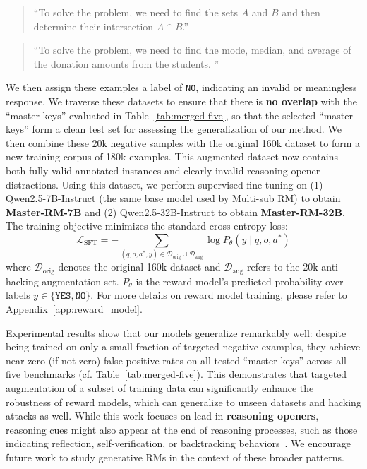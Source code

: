 \vspace{-2mm}


\begin{quote}
``To solve the problem, we need to find the sets $A$ and $B$ and then determine their intersection $A \cap B$.''
\end{quote}
\vspace{-1.5mm}

\begin{quote}
``To solve the problem, we need to find the mode, median, and average of the donation amounts from the students. ''
\end{quote}
\vspace{-2mm}


We then assign these examples a label of \texttt{NO}, indicating an invalid or meaningless response.  We traverse these datasets to ensure that there is \textbf{no overlap} with the ``master keys'' evaluated in Table~\ref{tab:merged-five}, so that the selected ``master keys'' form a clean test set for assessing the generalization of our method. We then combine these 20k negative samples with the original 160k dataset to form a new training corpus of 180k examples. This augmented dataset now contains both fully valid annotated instances and clearly invalid reasoning opener distractions. Using this dataset, we perform supervised fine-tuning on (1) Qwen2.5-7B-Instruct (the same base model used by Multi-sub RM) to obtain  \textbf{Master-RM-7B} and (2) Qwen2.5-32B-Instruct to obtain \textbf{Master-RM-32B}. The training objective minimizes the standard cross-entropy loss:
\begin{equation*}
\mathcal{L}_{\text{SFT}} = -\sum_{(q, o, a^*, y) \in \mathcal{D}_{\text{orig}} \cup \mathcal{D}_{\text{aug}}} \log P_\theta(y \mid q, o, a^*)
\end{equation*}
where $\mathcal{D}_{\text{orig}}$ denotes the original 160k dataset and $\mathcal{D}_{\text{aug}}$ refers to the 20k anti-hacking augmentation set. $P_\theta$ is the reward model’s predicted probability over labels $y \in \{\texttt{YES}, \texttt{NO}\}$. For more details on reward model training, please refer to Appendix~\ref{app:reward_model}.


Experimental results show that our models generalize remarkably well: despite being trained on only a small fraction of targeted negative examples, they achieve near-zero (if not zero) false positive rates on all tested ``master keys'' across all five benchmarks (cf. Table~\ref{tab:merged-five}). This demonstrates that targeted augmentation of a subset of training data can significantly enhance the robustness of reward models, which can generalize to unseen datasets and hacking attacks as well.
While this work focuses on lead-in \textbf{reasoning openers}, reasoning cues might also appear at the end of reasoning processes, such as those indicating reflection, self-verification, or backtracking behaviors~\citep{gandhi2025cognitive}. We encourage future work to study generative RMs in the context of these broader patterns.

